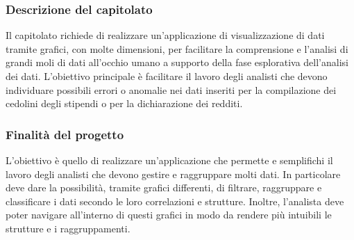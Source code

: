 		\subsubsection{Descrizione del capitolato}
			Il capitolato richiede di realizzare un’applicazione di visualizzazione di dati tramite grafici, con molte dimensioni, per facilitare la comprensione e l’analisi di grandi moli di dati all’occhio umano a supporto della fase esplorativa dell’analisi dei dati. L’obiettivo principale è facilitare il lavoro degli analisti che devono individuare possibili errori o anomalie nei dati inseriti per la compilazione dei cedolini degli stipendi o per la dichiarazione dei redditi.
		\subsubsection{Finalità del progetto}
			L’obiettivo è quello di realizzare un’applicazione che permette e semplifichi il lavoro degli analisti che devono gestire e raggruppare molti dati. In particolare deve dare la possibilità, tramite grafici differenti, di filtrare, raggruppare e classificare i dati secondo le loro correlazioni e strutture. Inoltre, l’analista deve poter navigare all’interno di questi grafici in modo da rendere più intuibili le strutture e i raggruppamenti.
